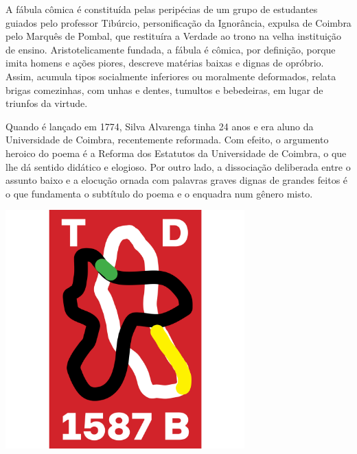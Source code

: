 \hspace*{-7cm}\hrulefill\hspace*{-7cm}

\medskip

\noindent{}A fábula cômica é constituída pelas peripécias de um grupo de estudantes guiados pelo professor Tibúrcio, personificação da Ignorância, expulsa de Coimbra pelo Marquês de Pombal, que restituíra a Verdade ao trono na velha instituição de ensino. Aristotelicamente fundada, a fábula é cômica, por definição, porque imita homens e ações piores, descreve matérias baixas e dignas de opróbrio. Assim, acumula tipos socialmente inferiores ou moralmente deformados, relata brigas comezinhas, com unhas e dentes, tumultos e bebedeiras, em lugar de triunfos da virtude.

Quando {} é lançado em 1774, Silva Alvarenga tinha 24 anos e era aluno da Universidade de Coimbra, recentemente reformada. Com efeito, o argumento heroico do poema é a Reforma dos Estatutos da Universidade de Coimbra, o que lhe dá sentido didático e elogioso. Por outro lado, a dissociação deliberada entre o assunto baixo e a elocução ornada com palavras graves dignas de grandes feitos é o que fundamenta o subtítulo do poema e o enquadra num gênero misto.

\vfill

\hspace*{-.4cm}\begin{minipage}[c]{.5\linewidth}
\small{
{}}
\end{minipage}

\pagebreak

\begin{center}
\hspace*{.5cm}\includegraphics[width=92mm]{./grid/tratado.jpg}
\end{center}

